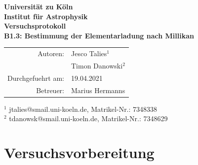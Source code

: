 \documentclass{scrartcl}
\begin{document}
\thispagestyle{empty}
\vspace*{\fill}
\begin{center}
	\Huge
	\textbf{Universität zu Köln}\\
	\LARGE
	\textbf{Institut für Astrophysik}\\
	\vspace{2cm}
	\textbf{Versuchsprotokoll}\\
	\vspace{0.5cm}
	\large
	\textbf{B1.3: Bestimmung der Elementarladung nach Millikan}\\
	\normalsize
	\vspace{2cm}
	\begin{tabular}{r l}
		Autoren: 	& Jesco Talies$^1$\\
					& Timon Danowski$^2$\\
		Durchgefuehrt am:	& 19.04.2021\\
		Betreuer:	& Marius Hermanns
	\end{tabular}
\end{center}
\vfill\footnotesize
$^1$ jtalies@smail.uni-koeln.de, Matrikel-Nr.: 7348338\\
$^2$ tdanowsk@smail.uni-koeln.de, Matrikel-Nr.: 7348629\\
\normalsize

\newpage 
\thispagestyle{empty}
\tableofcontents
\clearpage
\setcounter{page}{1}

\section{Versuchsvorbereitung}
\end{document}
